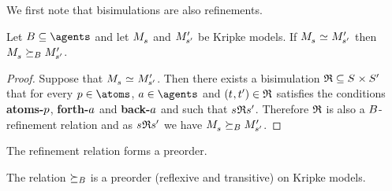 
We first note that bisimulations are also refinements.

\begin{proposition}\label{bisimulation-refinement}
Let $\agentsB \subseteq \agents$ and let $\kPModel{\kStateS}$ and ${M^{\prime}_{{{s}^{\prime}}}}$ be Kripke models.
If $\kPModel{\kStateS} \bisimilar \kPModelP{\kStateSP}$ then $\kPModel{\kStateS} \simulatesBs \kPModelP{\kStateSP}$.
\end{proposition}

\begin{proof}
    Suppose that $\kPModel{\kStateS} \bisimilar \kPModelP{\kStateSP}$.
    Then there exists a bisimulation $\bisimulation \subseteq \kStates \times \kStatesP$ that for every $\atomP \in \atoms$, $\agentA \in \agents$ and $(\kStateT, \kStateTP) \in \bisimulation$ satisfies the conditions {\bf atoms-$p$}, {\bf forth-$a$} and {\bf back-$a$} and such that $\kStateS \bisimulation \kStateSP$.
    Therefore $\mathfrak{R}$ is also a $B$-refinement relation and as $\kStateS \bisimulation \kStateSP$ we have $\kPModel{\kStateS} \simulatesBs \kPModelP{\kStateSP}$.
\end{proof}

The refinement relation forms a preorder.

\begin{proposition}
The relation $\succeq_{B}$ is a preorder (reflexive and transitive) on Kripke models.
\end{proposition}

